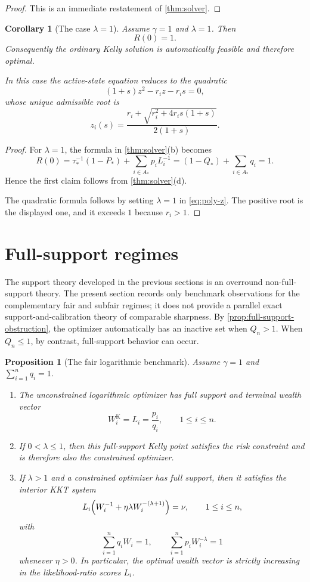 \documentclass[11pt]{article}
\newtheorem{proposition}[theorem]{Proposition}
\newtheorem{corollary}[theorem]{Corollary}
\theoremstyle{definition}
\theoremstyle{remark}
\newcommand{\1}{\mathbf{1}}
\begin{document}
\begin{proof}
This is an immediate restatement of \cref{thm:solver}.
\end{proof}

\begin{corollary}[The case $\lambda=1$]
\label{cor:lambda1}
Assume $\gamma=1$ and $\lambda=1$. Then
\[
R(0)=1.
\]
Consequently the ordinary Kelly solution is automatically feasible and therefore optimal.

In this case the active-state equation reduces to the quadratic
\[
(1+s)z^2-r_i z-r_i s=0,
\]
whose unique admissible root is
\[
z_i(s)=\frac{r_i+\sqrt{r_i^2+4r_i s(1+s)}}{2(1+s)}.
\]
\end{corollary}

\begin{proof}
For $\lambda=1$, the formula in \cref{thm:solver}(b) becomes
\[
R(0)=\tau_*^{-1}(1-P_*)+\sum_{i\in A_*} p_iL_i^{-1}
=(1-Q_*)+\sum_{i\in A_*} q_i=1.
\]
Hence the first claim follows from \cref{thm:solver}(d).

The quadratic formula follows by setting $\lambda=1$ in \eqref{eq:poly-z}. The positive root is the displayed one, and it exceeds $1$ because $r_i>1$.
\end{proof}

\section{Full-support regimes}
\label{sec:full-support}

The support theory developed in the previous sections is an overround non-full-support theory. The present section records only benchmark observations for the complementary fair and subfair regimes; it does not provide a parallel exact support-and-calibration theory of comparable sharpness. By \cref{prop:full-support-obstruction}, the optimizer automatically has an inactive set when $Q_n>1$. When $Q_n\le 1$, by contrast, full-support behavior can occur.

\begin{proposition}[The fair logarithmic benchmark]
\label{prop:fair-log}
Assume $\gamma=1$ and $\sum_{i=1}^n q_i=1$.
\begin{enumerate}[label=\textnormal{(\alph*)},leftmargin=*]
\item The unconstrained logarithmic optimizer has full support and terminal wealth vector
\[
W_i^{\mathrm K}=L_i=\frac{p_i}{q_i},\qquad 1\le i\le n.
\]
\item If $0<\lambda\le 1$, then this full-support Kelly point satisfies the risk constraint and is therefore also the constrained optimizer.
\item If $\lambda>1$ and a constrained optimizer has full support, then it satisfies the interior KKT system
\[
L_i\Bigl(W_i^{-1}+\eta\lambda W_i^{-(\lambda+1)}\Bigr)=\nu,
\qquad 1\le i\le n,
\]
with
\[
\sum_{i=1}^n q_iW_i=1,
\qquad
\sum_{i=1}^n p_iW_i^{-\lambda}=1
\]
whenever $\eta>0$. In particular, the optimal wealth vector is strictly increasing in the likelihood-ratio scores $L_i$.
\end{enumerate}
\end{proposition}
\end{document}
